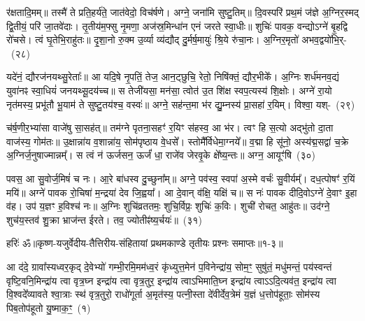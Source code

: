 र॑क्षतादि॒मम्॥ तस्मै॑ ते प्रति॒हर्य॑ते॒ जात॑वेदो॒ विच॑र्\mbox{}षणे। अग्ने॒ जना॑मि सुष्टु॒तिम्॥ दि॒वस्परि॑ प्रथ॒मं ज॑ज्ञे अ॒ग्निर॒स्मद् द्वि॒तीयं॒ परि॑ जा॒तवे॑दाः। तृ॒तीय॑म॒फ्सु नृ॒मणा॒ अज॑स्र॒मिन्धा॑न एनं जरते स्वा॒धीः॥ शुचिः॑ पावक॒ वन्द्यो\-ऽग्ने॑ बृ॒हद्वि रो॑चसे। त्वं घृ॒तेभि॒राहु॑तः॥ दृ॒शा॒नो रु॒क्म उ॒र्व्या व्य॑द्यौद् दु॒र्मर्\mbox{}ष॒मायुः॑ श्रि॒ये रु॑चा॒नः। अ॒ग्निर॒मृतो॑ अभव॒द्वयो॑भि॒र्-~(२८)

यदे॑नं॒ द्यौरज॑नयथ्सु॒रेताः᳚॥ आ यदि॒षे नृ॒पतिं॒ तेज॒ आन॒ट्छुचि॒ रेतो॒ निषि॑क्तं॒ द्यौर॒भीके᳚। अ॒ग्निः शर्ध॑मनव॒द्यं युवा॑नꣴ स्वा॒धियं॑ जनयथ्सू॒दय॑च्च॥ स तेजी॑यसा॒ मन॑सा॒ त्वोत॑ उ॒त शि॑क्ष स्वप॒त्यस्य॑ शि॒क्षोः। अग्ने॑ रा॒यो नृत॑मस्य॒ प्रभू॑तौ भू॒याम॑ ते सुष्टु॒तय॑श्च॒ वस्वः॑॥ अग्ने॒ सह॑न्त॒मा भ॑र द्यु॒म्नस्य॑ प्रा॒सहा॑ र॒यिम्। विश्वा॒ यश्-~(२९)

च॑र्\mbox{}ष॒णीर॒भ्या॑सा वाजे॑षु सा॒सह॑त्॥ तम॑ग्ने पृतना॒सहꣳ॑ र॒यिꣳ स॑हस्व॒ आ भ॑र। त्वꣳ हि स॒त्यो अद्भु॑तो दा॒ता वाज॑स्य॒ गोम॑तः॥ उ॒क्षान्ना॑य व॒शान्ना॑य॒ सोम॑पृष्ठाय वे॒धसे᳚। स्तोमै᳚र्विधेमा॒ग्नये᳚॥ व॒द्मा हि सू॑नो॒ अस्य॑द्म॒सद्वा॑ च॒क्रे अ॒ग्निर्ज॒नुषाज्मान्नम्᳚। स त्वं न॑ ऊर्जसन॒ ऊर्जं॑ धा॒ राजे॑व जेरवृ॒के क्षे᳚ष्य॒न्तः॥ अग्न॒ आयूꣳ॑षि~(३०)

पवस॒ आ सु॒वोर्ज॒मिषं॑ च नः। आ॒रे बा॑धस्व दु॒च्छुना᳚म्॥ अग्ने॒ पव॑स्व॒ स्वपा॑ अ॒स्मे वर्चः॑ सु॒वीर्यम्᳚। दध॒त्पोषꣳ॑ र॒यिं मयि॑॥ अग्ने॑ पावक रो॒चिषा॑ म॒न्द्रया॑ देव जि॒ह्वया᳚। आ दे॒वान् व॑क्षि॒ यक्षि॑ च॥ स नः॑ पावक दीदि॒वो\-ऽग्ने॑ दे॒वाꣳ इ॒हा व॑ह। उप॑ य॒ज्ञꣳ ह॒विश्च॑ नः॥ अ॒ग्निः शुचि॑व्रततमः॒ शुचि॒र्विप्रः॒ शुचिः॑ क॒विः। शुची॑ रोचत॒ आहु॑तः॥ उद॑ग्ने॒ शुच॑य॒स्तव॑ शु॒क्रा भ्राज॑न्त ईरते। तव॒ ज्योतीꣴ॑ष्य॒र्चयः॑॥~(३१)

{\anuvakamend[{पु॒रु॒नि॒ष्ठः पु॑र्वणीक भरा॒\-ऽभि वयो॑भि॒र्य आयूꣳ॑षि॒ विप्रः॒ शुचि॒श्चतु॑र्दश च}]}%

{हरिः॑ ॐ}{॥कृष्ण-यजुर्वेदीय-तैत्तिरीय-संहितायां प्रथमकाण्डे तृतीयः प्रश्नः समाप्तः॥१-३॥}

\setcounter{anuvakam}{0}
आ द॑दे॒ ग्रावा᳚स्यध्वर॒कृद् दे॒वेभ्यो॑ गम्भी॒रमि॒मम॑ध्व॒रं कृ॑ध्युत्त॒मेन॑ प॒विनेन्द्रा॑य॒ सोम॒ꣳ॒ सुषु॑तं॒ मधु॑मन्तं॒ पय॑स्वन्तं वृष्टि॒वनि॒मिन्द्रा॑य त्वा वृत्र॒घ्न इन्द्रा॑य त्वा वृत्र॒तुर॒ इन्द्रा॑य त्वा\-ऽभिमाति॒घ्न इन्द्रा॑य त्वा\-ऽऽ\-दि॒त्यव॑त॒ इन्द्रा॑य त्वा वि॒श्वदे᳚व्यावते श्वा॒त्राः स्थ॑ वृत्र॒तुरो॒ राधो॑गूर्ता अ॒मृत॑स्य॒ पत्नी॒स्ता दे॑वीर्देव॒त्रेमं य॒ज्ञं ध॒त्तोप॑हूताः॒ सोम॑स्य पिब॒तोप॑हूतो यु॒ष्माक॒ꣳ॒~(१)

